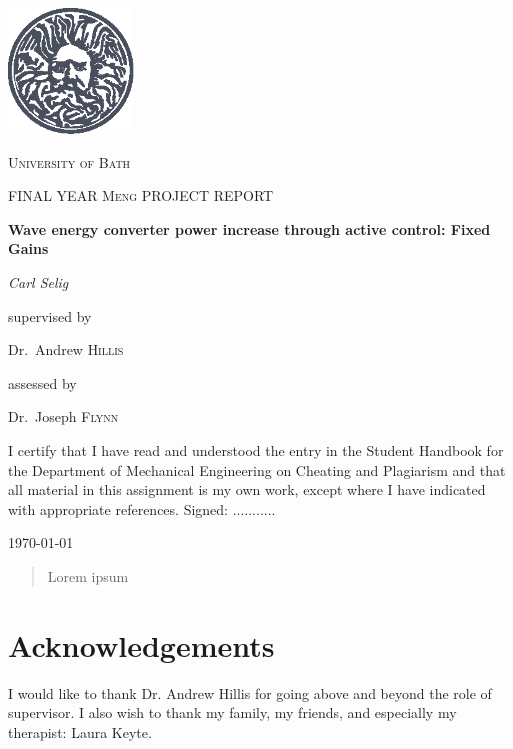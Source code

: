 \documentclass{report}
\begin{document}
\begin{titlepage}
	\centering
	\includegraphics[width=0.25\textwidth]{graphics/logo}\par\vspace{1cm}
	{\scshape\LARGE University of Bath \par}
	\vspace{1cm}
	{\scshape\Large FINAL YEAR Meng PROJECT REPORT\par}
	\vspace{1cm}
	{\huge\bfseries Wave energy converter power increase through active control: Fixed Gains\par}
	\vspace{2cm}
	{\Large\itshape Carl Selig\par}

	\vfill
	
	supervised by\par
	Dr.~Andrew \textsc{Hillis}\par
	assessed by\par
	Dr.~Joseph \textsc{Flynn}

	\vfill
	
\tiny{I certify that I have read and understood the entry in the Student Handbook for the
Department of Mechanical Engineering on Cheating and Plagiarism and that all
material in this assignment is my own work, except where I have indicated with
appropriate references. Signed: ...........}

	{\large \today\par}
\end{titlepage}

\begin{abstract}
Lorem ipsum
\end{abstract}
\section*{Acknowledgements}
I would like to thank Dr. Andrew Hillis for going above and beyond the role of supervisor. I also wish to thank my family, my friends, and especially my therapist: Laura Keyte.
\tableofcontents
\listoffigures
\listoftables
\end{document}
